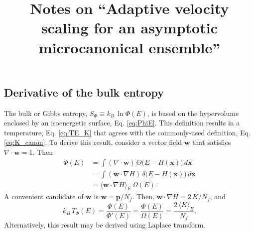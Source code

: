 \documentclass[preprint]{revtex4-1}
\begin{document}
\title{Notes on ``Adaptive velocity scaling for an asymptotic
microcanonical ensemble''}
\author{}

\maketitle



\subsection{Derivative of the bulk entropy}



The bulk
or Gibbs entropy\cite{cagin1988, haile, dunkel2014},
$S_\Phi \equiv k_B \, \ln \Phi(E)$,
is based on the hypervolume enclosed by an isoenergetic surface,
Eq. \eqref{eq:PhiE}.
%
This definition results in a temperature, Eq. \eqref{eq:TE_K}
that agrees with the commonly-used definition,
Eq. \eqref{eq:K_canon}.
%
To derive this result,
consider a vector field $\mathbf w$
that satisfies $\nabla \cdot \mathbf w = 1$.
Then
%
\begin{align*}
  \Phi(E)
  &=
  \int
    \left(
      \nabla \cdot \mathbf w
    \right)
    \,
    \Theta\bigl(
      E - H(\mathbf x)
    \bigr)
    \, d\mathbf x
  \\
  &=
  \int
    \left( \mathbf w \cdot \nabla H \right)
    \,
    \delta\bigl(
      E - H(\mathbf x)
    \bigr)
    \, d\mathbf x
  \\
  &= \langle \mathbf w \cdot \nabla H \rangle_E
    \,
    \Omega(E)
  .
\end{align*}
%
A convenient candidate of $\mathbf w$ is
$\mathbf w = \mathbf p / N_f$.
%
Then,
$\mathbf w \cdot \nabla H = 2 \, K / N_f$,
and
%
\begin{equation}
  k_B \, T_\Phi(E)
  =
  \frac{ \Phi(E) } { \Phi'(E) }
  =
  \frac{ \Phi(E) } { \Omega(E) }
  =
  \frac{ 2 \, \langle K \rangle_E } { N_f }
  .
  \label{eq:Tbulk}
\end{equation}
%
Alternatively, this result may be derived using
Laplace transform\cite{pearson1985, haile}.
%
\end{document}
